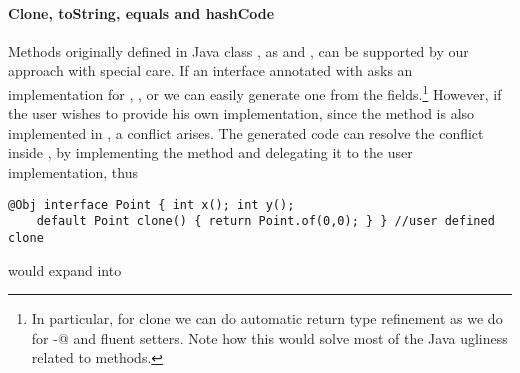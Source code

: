 \begin{comment}
\subsection{Class Invariants in ClassLess Java}
Since objects are created by automatically generated methods, another limitation
of our current approach is that there is no place where the user can dynamically
check for class invariants. In Java often we see code like
\begin{lstlisting}
class Point{ int x; int y;
  Point(int x; int y){this.x=x;this.y=y; assert this.checkInvariant();}
  private boolean checkInvariant(){... x>0,y>0...}
}
\end{lstlisting}

We are considering an extension of our annotation where
default methods with the special name \Q@checkInvariant()@ will be called inside the \Q@of@ methods.
If multiple interfaces are implemented, and more then one offers
\Q@checkInvariant()@,  a composed implementation could be automatically generated, composing by \Q@&&@ the various competing implementations.
\end{comment}

\paragraph{Clone, toString, equals and hashCode}
Methods originally defined in Java class \Q@Object@, as \Q@clone@ and
\Q@toString@, can be supported by our approach with special care. If an
interface annotated with \mixin asks an implementation for \Q@clone@,
\Q@toString@, \Q@equals@ or \Q@hashCode@ we can easily generate one from the
fields.\footnote{In particular, for clone we can do automatic return type
  refinement as we do for \Q@with-@ and fluent setters. Note how this would
  solve most of the Java ugliness related to \Q@clone@ methods.}  However, if
the user wishes to provide his own implementation, since the method is also
implemented in \Q@Object@, a conflict arises. The generated code can resolve the
conflict inside \Q@of@, by implementing the method and delegating it to the user
implementation, thus

\begin{lstlisting}
@Obj interface Point { int x(); int y();
    default Point clone() { return Point.of(0,0); } } //user defined clone
\end{lstlisting}
would expand into

